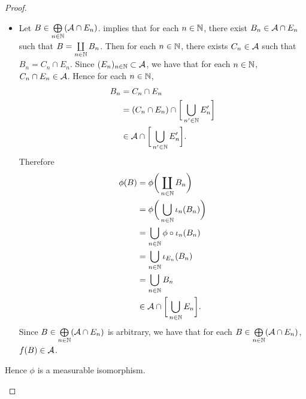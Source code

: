 \documentclass{book}
\begin{document}
\begin{proof}
\begin{itemize}
\begin{itemize}
				\item Let $B \in \bigoplus\limits_{n \in \mathbb{N}} (\mathcal{A} \cap E_n)$.  implies that for each $n \in \mathbb{N}$, there exist $B_n \in \mathcal{A} \cap E_n$ such that $B = \coprod\limits_{n \in \mathbb{N}} B_n$. Then for each $n \in \mathbb{N}$, there exists $C_n \in \mathcal{A}$ such that $B_n = C_n \cap E_n$. Since $(E_n)_{n \in \mathbb{N}} \subset \mathcal{A}$, we have that for each $n \in \mathbb{N}$, $C_n \cap E_n \in \mathcal{A}$. Hence for each $n \in \mathbb{N}$, 
				\begin{align*}
					B_n
					& = C_n \cap E_n \\
					& = (C_n \cap E_n) \cap \bigg[ \bigcup\limits_{n' \in \mathbb{N}} E_n' \bigg] \\
					& \in \mathcal{A} \cap \bigg[ \bigcup\limits_{n' \in \mathbb{N}} E_n' \bigg].
				\end{align*}
				Therefore
				\begin{align*}
					\phi(B)
					& = \phi \bigg(\coprod\limits_{n \in \mathbb{N}} B_n  \bigg) \\
					& = \phi \bigg( \bigcup_{n \in \mathbb{N}} \iota_n(B_n) \bigg) \\
					& = \bigcup_{n \in \mathbb{N}} \phi \circ \iota_n(B_n) \\
					& = \bigcup_{n \in \mathbb{N}} \iota_{E_n}(B_n) \\
					& = \bigcup_{n \in \mathbb{N}} B_n \\
					& \in \mathcal{A} \cap \bigg[ \bigcup\limits_{n \in \mathbb{N}} E_n \bigg].
				\end{align*}
				Since $B \in \bigoplus\limits_{n \in \mathbb{N}} (\mathcal{A} \cap E_n)$ is arbitrary, we have that for each $B \in \bigoplus\limits_{n \in \mathbb{N}} (\mathcal{A} \cap E_n)$, $f(B) \in \mathcal{A}$. 
			\end{itemize}
			Hence $\phi$ is a measurable isomorphism.
		\end{itemize}
	\end{proof}
	
	
	
	
	
	
	
	
	
	
	
	
	
	
	
	
	
	
	
	
	
	
	
	
	
	
	
	
	
	
	
	
	\newpage
\end{document}
